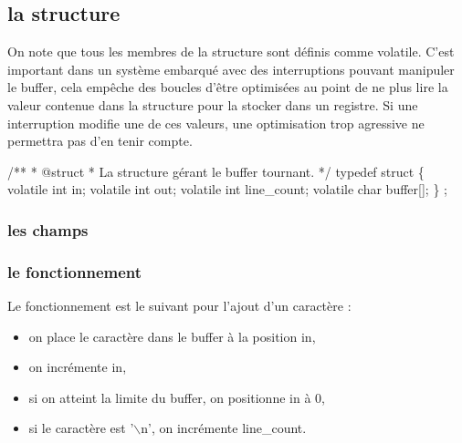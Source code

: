 \documentclass[10pt]{article}%
\begin{document}
\subsection{la structure}

On note que tous les membres de la structure sont définis comme {\Tt{}volatile\nwendquote}. C'est important dans un système embarqué avec des interruptions pouvant manipuler le buffer, cela empêche des boucles d'être optimisées au point de ne plus lire la valeur contenue dans la structure pour la stocker dans un registre. Si une interruption modifie une de ces valeurs, une optimisation trop agressive ne permettra pas d'en tenir compte.


\nwenddocs{}\endmoddef\nwstartdeflinemarkup{}\nwenddeflinemarkup
/**
 * @struct 
 * La structure gérant le buffer tournant.
 */
typedef struct \{
    volatile int in;
    volatile int out;
    volatile int line_count;
    volatile char buffer[];
\} ;
\eatline
{}\nwendcode{}\nwdocspar
\nwenddocs{}\nwdocspar
\subsubsection{les champs}

\subsubsection{le fonctionnement}
Le fonctionnement est le suivant pour l'ajout d'un caractère :

\begin{itemize}
  \item on place le caractère dans le buffer à la position {\Tt{}in\nwendquote},
  \item on incrémente {\Tt{}in\nwendquote},
  \item si on atteint la limite du buffer, on positionne {\Tt{}in\nwendquote} à 0,
  \item si le caractère est '$\backslash$n', on incrémente {\Tt{}line{\_}count\nwendquote}.
\end{itemize}
\end{document}

